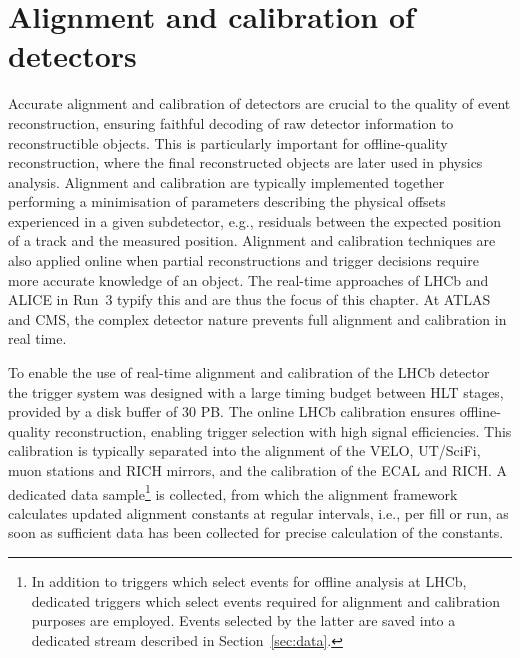 \section{Alignment and calibration of detectors}

Accurate alignment and calibration of detectors are crucial to the quality of event reconstruction, ensuring faithful decoding of raw detector information to reconstructible objects. This is particularly important for offline-quality reconstruction, where the final reconstructed objects are later used in physics analysis. Alignment and calibration are typically implemented together %
performing a minimisation of parameters describing the physical offsets experienced in a given subdetector, e.g., residuals between the expected position of a track and the measured position. Alignment and calibration techniques are also applied online when partial reconstructions and trigger decisions require more accurate knowledge of an object. The real-time approaches of LHCb and ALICE in Run~3 typify this and are thus the focus of this chapter. At ATLAS and CMS, the complex detector nature prevents full alignment and calibration in real time.

To enable the use of real-time alignment and calibration of the LHCb detector the trigger system was designed with a large timing budget between HLT stages, provided by a disk buffer of 30 PB. The online LHCb calibration ensures offline-quality reconstruction, enabling trigger selection with high signal efficiencies. This calibration is typically separated into the alignment of the VELO, UT/SciFi, muon stations and RICH mirrors, and the calibration of the ECAL and RICH. A dedicated data sample\footnote{In addition to triggers which select events for offline analysis at LHCb, dedicated triggers which select events required for alignment and calibration purposes are employed. Events selected by the latter are saved into a dedicated stream described in Section~\ref{sec:data}.} is collected, from which the alignment framework calculates updated alignment constants at regular intervals, i.e., per fill or run, as soon as sufficient data has been collected for precise calculation of the constants.

